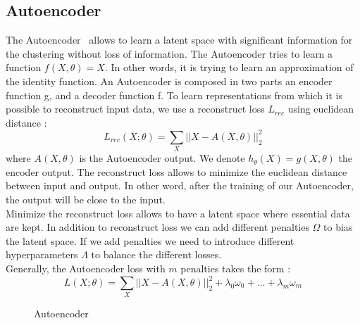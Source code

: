 \subsection{Autoencoder}
The Autoencoder~\cite{Goodfellow-et-al-2016} allows to learn a latent space with significant
information for the clustering without loss of information.
The Autoencoder tries to learn a function $f (X, \theta) = X$. In
other words, it is trying to learn an approximation of the identity
function. An Autoencoder is composed in two parts an encoder function
g, and a decoder function f. To learn representations from which it is 
possible to reconstruct input data, we use a
reconstruct loss $L_{rec}$ using euclidean distance :
\begin{equation}
  L_{rec}(X; \theta) = \sum\limits_X|| X - A(X, \theta) ||_2^2 
\end{equation}
where $A(X, \theta)$ is the Autoencoder output.
We denote $h_\theta(X) = g(X,\theta)$ the encoder output.
The reconstruct loss allows to minimize the euclidean distance between input and 
output. In other word, after the training of our Autoencoder, the output will be
close  to the input.
\\Minimize the reconstruct loss allows to have a latent space where essential 
data are kept. In addition to reconstruct loss we can add different penalties 
$\Omega$ to bias the latent space. If we add penalties we need to introduce
different hyperparameters $\Lambda$ to balance the different losses.
\\Generally, the Autoencoder loss with $m$ penalties takes the form :
\begin{equation} 
L(X;\theta) = \sum\limits_X|| X - A(X, \theta) ||_2^2 + \lambda_0 \omega_0 + 
\ldots + \lambda_m \omega_m  
\end{equation}
\begin{figure}
  \centering
  \caption{Autoencoder}
  \label{fig:autoenc}
\end{figure}
